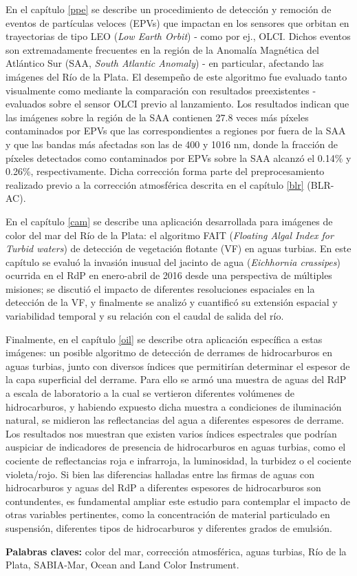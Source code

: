 En el capítulo \ref{ppe} se describe un procedimiento de detección y remoción de eventos de partículas veloces (EPVs) que impactan en los sensores que orbitan en trayectorias de tipo LEO (\textit{Low Earth Orbit}) - como por ej., OLCI. Dichos eventos son extremadamente frecuentes en la región de la Anomalía Magnética del Atlántico Sur (SAA, \textit{South Atlantic Anomaly}) - en particular, afectando las imágenes del Río de la Plata. El desempeño de este algoritmo fue evaluado tanto visualmente como mediante la comparación con resultados preexistentes - evaluados sobre el sensor OLCI previo al lanzamiento. Los resultados indican que las imágenes sobre la región de la SAA contienen 27.8 veces más píxeles contaminados por EPVs que las correspondientes a regiones por fuera de la SAA y que las bandas más afectadas son las de 400 y 1016 nm, donde la fracción de píxeles detectados como contaminados por EPVs sobre la SAA alcanzó el 0.14\% y 0.26\%, respectivamente. Dicha corrección forma parte del preprocesamiento realizado previo a la corrección atmosférica descrita en el capítulo \ref{blr} (BLR-AC).

En el capítulo \ref{cam} se describe una aplicación desarrollada para imágenes de color del mar del Río de la Plata: el algoritmo FAIT (\textit{Floating Algal Index for Turbid waters}) de detección de vegetación flotante (VF) en aguas turbias. En este capítulo se evaluó la invasión inusual del jacinto de agua (\textit{Eichhornia crassipes}) ocurrida en el RdP en enero-abril de 2016 desde una perspectiva de múltiples misiones; se discutió el impacto de diferentes resoluciones espaciales en la detección de la VF, y finalmente se analizó y cuantificó su extensión espacial y variabilidad temporal y su relación con el caudal de salida del río.

Finalmente, en el capítulo \ref{oil} se describe otra aplicación específica a estas imágenes: un posible algoritmo de detección de derrames de hidrocarburos en aguas turbias, junto con diversos índices que permitirían determinar el espesor de la capa superficial del derrame. Para ello se armó una muestra de aguas del RdP a escala de laboratorio a la cual se vertieron diferentes volúmenes de hidrocarburos, y habiendo expuesto dicha muestra a condiciones de iluminación natural, se midieron las reflectancias del agua a diferentes espesores de derrame. Los resultados nos muestran que existen varios índices espectrales que podrían auspiciar de indicadores de presencia de hidrocarburos en aguas turbias, como el cociente de reflectancias roja e infrarroja, la luminosidad, la turbidez o el cociente violeta/rojo. Si bien las diferencias halladas entre las firmas de aguas con hidrocarburos y aguas del RdP a diferentes espesores de hidrocarburos son contundentes, es fundamental ampliar este estudio para contemplar el impacto de otras variables pertinentes, como la concentración de material particulado en suspensión, diferentes tipos de hidrocarburos y diferentes grados de emulsión.


\bigskip

\noindent\textbf{Palabras claves:} color del mar, corrección atmosférica, aguas turbias, Río de la Plata, SABIA-Mar, Ocean and Land Color Instrument.